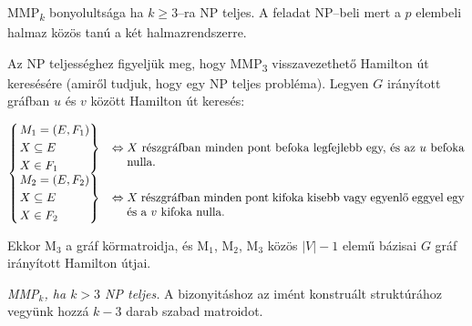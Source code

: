 MMP\textsubscript{$k$} bonyolultsága ha $k \geq 3$--ra NP teljes. A feladat
NP--beli mert a $p$ elembeli halmaz közös tanú a két halmazrendszerre.

Az NP teljességhez figyeljük meg, hogy MMP\textsubscript{$3$} visszavezethető
Hamilton út keresésére (amiről tudjuk, hogy egy NP teljes probléma). Legyen $G$
irányított gráfban $u$ és $v$ között Hamilton út keresés:

\[
	\begin{cases}
	\begin{rcases}
		M_1=(E,F_1)   \\
		X \subseteq E \\
		X \in F_1
	\end{rcases} & \Leftrightarrow \parbox[t]{10cm} {$X$ részgráfban minden pont
	befoka legfejlebb egy, és az $u$ befoka nulla.}                              \\
	\begin{rcases}
		M_2=(E,F_2)   \\
		X \subseteq E \\
		X \in F_2
	\end{rcases} & \Leftrightarrow \parbox[t]{10cm} {$X$ részgráfban minden pont
	kifoka kisebb vagy egyenlő eggyel egy és a $v$ kifoka nulla.}
	\end{cases}
\]

Ekkor M$_3$  a gráf körmatroidja, és M$_1$, M$_2$, M$_3$ közös $|V|-1$ elemű
bázisai $G$ gráf irányított Hamilton útjai.

\vspace{0.4cm}
\emph{MMP$_k$, ha $k>3$ NP teljes.}
A bizonyitáshoz az imént konstruált struktúrához vegyünk hozzá $k-3$ darab
szabad matroidot.
